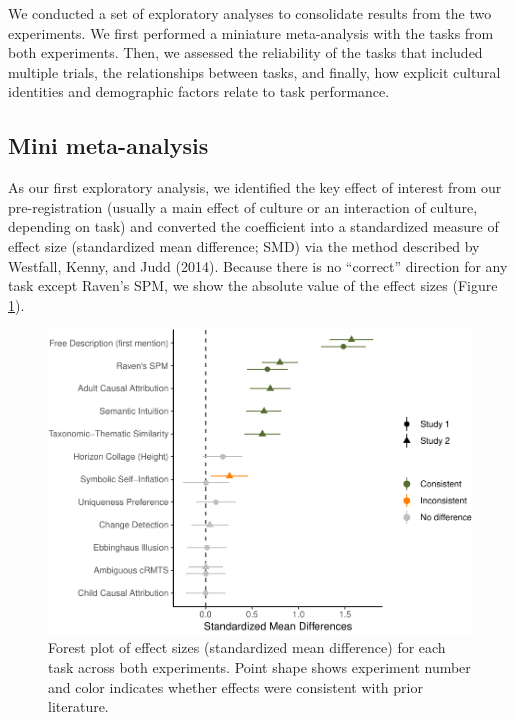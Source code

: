 \documentclass[
  man,floatsintext]{apa6}
\begin{document}
We conducted a set of exploratory analyses to consolidate results from the two experiments. We first performed a miniature meta-analysis with the tasks from both experiments. Then, we assessed the reliability of the tasks that included multiple trials, the relationships between tasks, and finally, how explicit cultural identities and demographic factors relate to task performance.

\hypertarget{mini-meta-analysis}{%
\subsection{Mini meta-analysis}\label{mini-meta-analysis}}

As our first exploratory analysis, we identified the key effect of interest from our pre-registration (usually a main effect of culture or an interaction of culture, depending on task) and converted the coefficient into a standardized measure of effect size (standardized mean difference; SMD) via the method described by Westfall, Kenny, and Judd (2014). Because there is no ``correct'' direction for any task except Raven's SPM, we show the absolute value of the effect sizes (Figure \ref{fig:es-plot}).

\begin{figure}
\centering
\includegraphics{CCRR_manuscript_files/figure-latex/es-plot-1.pdf}
\caption{\label{fig:es-plot}Forest plot of effect sizes (standardized mean difference) for each task across both experiments. Point shape shows experiment number and color indicates whether effects were consistent with prior literature.}
\end{figure}
\end{document}
